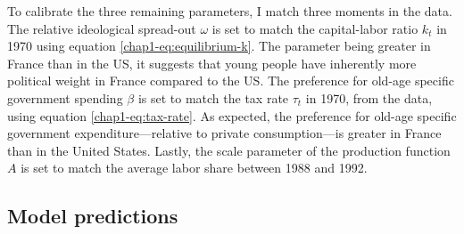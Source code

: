 To calibrate the three remaining parameters, I match three moments in the data. 
The relative ideological spread-out $\omega$ is set to match the capital-labor ratio $k_t$ in 1970 using equation \eqref{chap1-eq:equilibrium-k}.
The parameter being greater in France than in the US, it suggests that young people have inherently more political weight in France compared to the US.
The preference for old-age specific government spending $\beta$ is set to match the tax rate $\tau_t$ in 1970, from the data, using equation \eqref{chap1-eq:tax-rate}.
As expected, the preference for old-age specific government expenditure---relative to private consumption---is greater in France than in the United States.
Lastly, the scale parameter of the production function $A$ is set to match the average labor share between 1988 and 1992.

\subsection{Model predictions}\label{chap1-model_pred}


